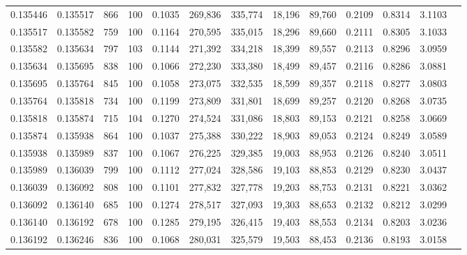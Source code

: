\begin{tabular}{rrrrrrrrrrrrr}
0.135446 & 0.135517 &   866 & 100 &                                     0.1035 & 269,836 & 335,774 &  18,196 &  89,760 & 0.2109 & 0.8314 & 3.1103 \\
0.135517 & 0.135582 &   759 & 100 &                                     0.1164 & 270,595 & 335,015 &  18,296 &  89,660 & 0.2111 & 0.8305 & 3.1033 \\
0.135582 & 0.135634 &   797 & 103 &                                     0.1144 & 271,392 & 334,218 &  18,399 &  89,557 & 0.2113 & 0.8296 & 3.0959 \\
0.135634 & 0.135695 &   838 & 100 &                                     0.1066 & 272,230 & 333,380 &  18,499 &  89,457 & 0.2116 & 0.8286 & 3.0881 \\
0.135695 & 0.135764 &   845 & 100 &                                     0.1058 & 273,075 & 332,535 &  18,599 &  89,357 & 0.2118 & 0.8277 & 3.0803 \\
0.135764 & 0.135818 &   734 & 100 &                                     0.1199 & 273,809 & 331,801 &  18,699 &  89,257 & 0.2120 & 0.8268 & 3.0735 \\
0.135818 & 0.135874 &   715 & 104 &                                     0.1270 & 274,524 & 331,086 &  18,803 &  89,153 & 0.2121 & 0.8258 & 3.0669 \\
0.135874 & 0.135938 &   864 & 100 &                                     0.1037 & 275,388 & 330,222 &  18,903 &  89,053 & 0.2124 & 0.8249 & 3.0589 \\
0.135938 & 0.135989 &   837 & 100 &                                     0.1067 & 276,225 & 329,385 &  19,003 &  88,953 & 0.2126 & 0.8240 & 3.0511 \\
0.135989 & 0.136039 &   799 & 100 &                                     0.1112 & 277,024 & 328,586 &  19,103 &  88,853 & 0.2129 & 0.8230 & 3.0437 \\
0.136039 & 0.136092 &   808 & 100 &                                     0.1101 & 277,832 & 327,778 &  19,203 &  88,753 & 0.2131 & 0.8221 & 3.0362 \\
0.136092 & 0.136140 &   685 & 100 &                                     0.1274 & 278,517 & 327,093 &  19,303 &  88,653 & 0.2132 & 0.8212 & 3.0299 \\
0.136140 & 0.136192 &   678 & 100 &                                     0.1285 & 279,195 & 326,415 &  19,403 &  88,553 & 0.2134 & 0.8203 & 3.0236 \\
0.136192 & 0.136246 &   836 & 100 &                                     0.1068 & 280,031 & 325,579 &  19,503 &  88,453 & 0.2136 & 0.8193 & 3.0158 \\

\end{tabular}
